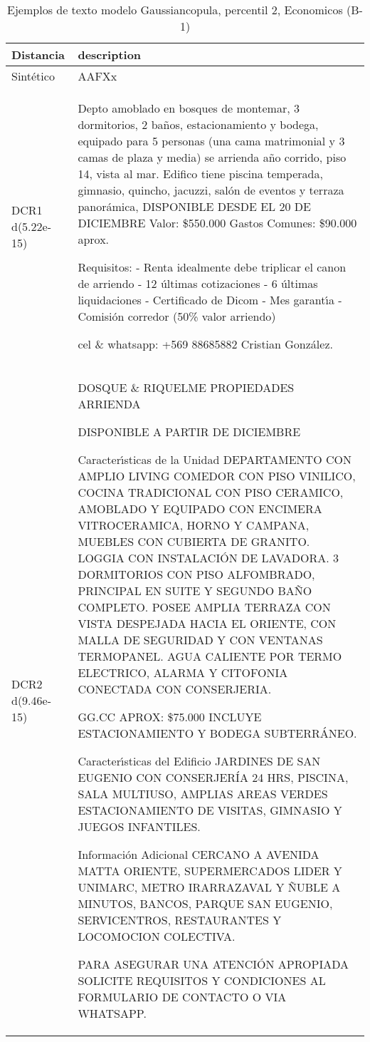 \begin{table}[H]
\centering
\fontsize{10}{14}\selectfont
\caption{Ejemplos de texto modelo Gaussiancopula, percentil 2, Economicos (B-1)}
\label{table-example-economicos-b-1-gaussiancopula-2p-text}
\begin{tabular}{|l|m{35em}|}
\hline
\rowcolor[gray]{0.8}
Distancia & description \\
\hline Sintético & AAFXx \\
\hline DCR1 d(5.22e-15) & Depto amoblado en bosques de montemar, 3 dormitorios, 2 ba\~nos, estacionamiento y bodega, equipado para 5 personas (una cama matrimonial y 3 camas de plaza y media) se arrienda a\~no corrido, piso 14, vista al mar.
Edifico tiene piscina temperada, gimnasio, quincho, jacuzzi, sal\'on de eventos y terraza panor\'amica, 
DISPONIBLE DESDE EL 20 DE DICIEMBRE
Valor: \$550.000
Gastos Comunes: \$90.000 aprox.

Requisitos:
- Renta idealmente debe triplicar el canon de arriendo 
- 12 \'ultimas cotizaciones
- 6 \'ultimas liquidaciones
- Certificado de Dicom
- Mes garant{\'\i}a
- Comisi\'on corredor (50\% valor arriendo)

cel \& whatsapp: +569 88685882
Cristian Gonz\'alez.
 \\
\hline DCR2 d(9.46e-15) & DOSQUE \& RIQUELME PROPIEDADES ARRIENDA

DISPONIBLE A PARTIR DE DICIEMBRE

Caracter{\'\i}sticas de la Unidad
DEPARTAMENTO CON AMPLIO LIVING COMEDOR CON PISO VINILICO, COCINA TRADICIONAL CON PISO CERAMICO, AMOBLADO Y EQUIPADO CON ENCIMERA VITROCERAMICA, HORNO Y CAMPANA, MUEBLES CON CUBIERTA DE GRANITO. LOGGIA CON INSTALACI\'ON DE LAVADORA. 3 DORMITORIOS CON PISO ALFOMBRADO, PRINCIPAL EN SUITE Y SEGUNDO BA\~NO COMPLETO. POSEE AMPLIA TERRAZA CON VISTA DESPEJADA HACIA EL ORIENTE, CON MALLA DE SEGURIDAD Y CON VENTANAS TERMOPANEL. AGUA CALIENTE POR TERMO ELECTRICO, ALARMA Y CITOFONIA CONECTADA CON CONSERJERIA.

GG.CC APROX: \$75.000
INCLUYE ESTACIONAMIENTO Y BODEGA SUBTERR\'ANEO.

Caracter{\'\i}sticas del Edificio
JARDINES DE SAN EUGENIO CON CONSERJER\'IA 24 HRS, PISCINA, SALA MULTIUSO, AMPLIAS AREAS VERDES ESTACIONAMIENTO DE VISITAS, GIMNASIO Y JUEGOS INFANTILES.

Informaci\'on Adicional
CERCANO A AVENIDA MATTA ORIENTE, SUPERMERCADOS LIDER Y UNIMARC, METRO IRARRAZAVAL Y \~NUBLE A MINUTOS, BANCOS, PARQUE SAN EUGENIO, SERVICENTROS, RESTAURANTES Y LOCOMOCION COLECTIVA.

PARA ASEGURAR UNA ATENCI\'ON APROPIADA SOLICITE REQUISITOS Y CONDICIONES AL FORMULARIO DE CONTACTO O VIA WHATSAPP.  
 \\
\hline
\end{tabular}
\end{table}
